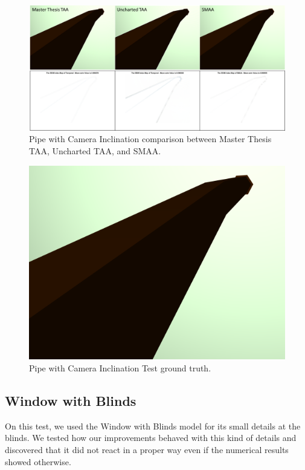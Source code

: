 \documentclass{cslthse-msc}
\begin{document}
\begin{figure}[H]
	\centering
	\includegraphics[scale=0.7]{images/results/pipe_inclination.png}
	\caption{Pipe with Camera Inclination comparison between Master Thesis TAA, Uncharted TAA, and SMAA.}\label{fig:pipe_inclination_render}
\end{figure}

\begin{figure}[H]
	\centering
	\includegraphics[scale=0.2]{images/results/pipe_with_inclination_sobel_ground_truth.png}
	\caption{Pipe with Camera Inclination Test ground truth.}\label{fig:pipe_inclination_truth}
\end{figure}


\subsection{Window with Blinds}
On this test, we used the Window with Blinds model for its small details at the blinds. We tested how our improvements behaved with this kind of details and discovered that it did not react in a proper way even if the numerical results showed otherwise.
\end{document}

